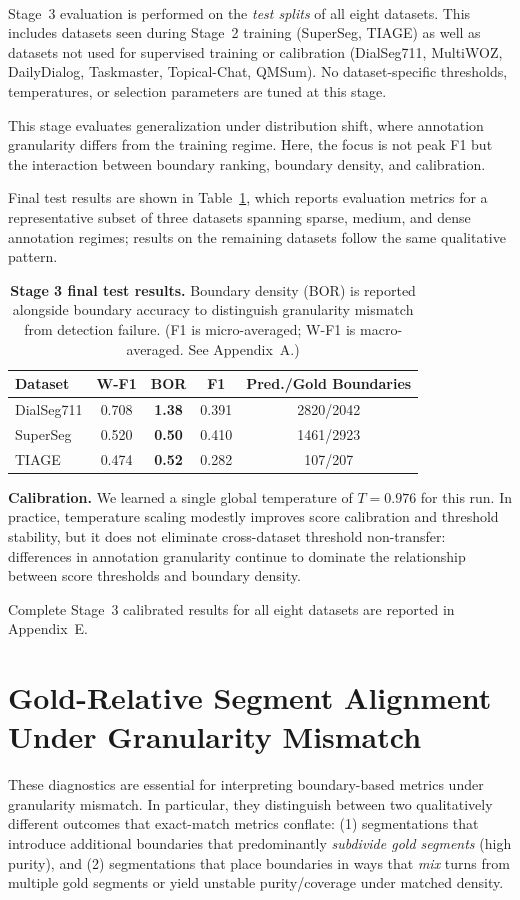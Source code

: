 \documentclass{article}
\makeatletter
\newcommand{\myparagraph}[1]{%
  \paragraph{\@addpunct{#1}}%
}
\makeatother
\begin{document}
\myparagraph{Final test protocol}
Stage~3 evaluation is performed on the \emph{test splits} of all eight
datasets. This includes datasets seen during Stage~2 training
(SuperSeg, TIAGE) as well as datasets not used for supervised training
or calibration (DialSeg711, MultiWOZ, DailyDialog, Taskmaster,
Topical-Chat, QMSum). No dataset-specific thresholds, temperatures, or
selection parameters are tuned at this stage.

This stage evaluates generalization under distribution shift, where
annotation granularity differs from the training regime. Here, the
focus is not peak F1 but the interaction between boundary ranking,
boundary density, and calibration.

Final test results are shown in Table~\ref{tab:stage3}, which reports
evaluation metrics for a representative subset of three datasets
spanning sparse, medium, and dense annotation regimes; results on the
remaining datasets follow the same qualitative pattern.

\begin{table}[t]
  \centering
  \begin{tabular}{lcccc}
    \toprule
    Dataset & W-F1 & \textbf{BOR} & F1 & Pred./Gold Boundaries \\
    \midrule
    DialSeg711 & 0.708 & \textbf{1.38} & 0.391 & 2820/2042 \\
    SuperSeg   & 0.520 & \textbf{0.50} & 0.410 & 1461/2923 \\
    TIAGE      & 0.474 & \textbf{0.52} & 0.282 & 107/207 \\
    \bottomrule
  \end{tabular}
  \caption{\textbf{Stage 3 final test results.}
    Boundary density (BOR) is reported alongside boundary accuracy to
    distinguish granularity mismatch from detection failure. (F1 is micro-averaged; W-F1 is macro-averaged. See Appendix~A.)}
  \label{tab:stage3}
\end{table}

\noindent\textbf{Calibration.}
We learned a single global temperature of $T = 0.976$ for this run. In
practice, temperature scaling modestly improves score calibration and
threshold stability, but it does not eliminate cross-dataset threshold
non-transfer: differences in annotation granularity continue to
dominate the relationship between score thresholds and boundary
density.

Complete Stage~3 calibrated results for all eight datasets are reported
in Appendix~E.

\section{Gold-Relative Segment Alignment Under Granularity Mismatch}
These diagnostics are essential for interpreting boundary-based metrics under
granularity mismatch. In particular, they distinguish between two qualitatively
different outcomes that exact-match metrics conflate: (1) segmentations that
introduce additional boundaries that predominantly \emph{subdivide gold
segments} (high purity), and (2) segmentations that place boundaries in ways that
\emph{mix} turns from multiple gold segments or yield unstable
purity/coverage under matched density.
\end{document}
